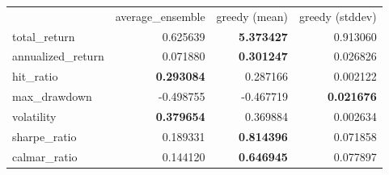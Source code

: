 \begin{tabular}{lrrr}
 & average_ensemble & greedy (mean) & greedy (stddev) \\
total_return & 0.625639 & \bfseries 5.373427 & 0.913060 \\
annualized_return & 0.071880 & \bfseries 0.301247 & 0.026826 \\
hit_ratio & \bfseries 0.293084 & 0.287166 & 0.002122 \\
max_drawdown & -0.498755 & -0.467719 & \bfseries 0.021676 \\
volatility & \bfseries 0.379654 & 0.369884 & 0.002634 \\
sharpe_ratio & 0.189331 & \bfseries 0.814396 & 0.071858 \\
calmar_ratio & 0.144120 & \bfseries 0.646945 & 0.077897 \\
\end{tabular}
